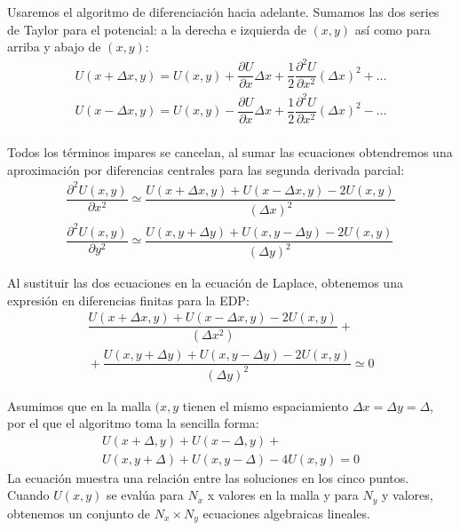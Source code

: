 \begin{frame}
\fontsize{14}{14}\selectfont
Usaremos el algoritmo de diferenciación hacia adelante. Sumamos las dos series de Taylor para el potencial: a la derecha e izquierda de $(x,y)$ así como para arriba y abajo de $(x,y)$:
\begin{eqnarray*}
U(x+\Delta x,y) = U(x,y) + \dfrac{\partial U}{\partial x} \Delta x + \dfrac{1}{2} \dfrac{\partial^{2} U}{\partial x^{2}} (\Delta x)^{2} + \ldots \\
U(x -\Delta x,y) = U(x,y) - \dfrac{\partial U}{\partial x} \Delta x + \dfrac{1}{2} \dfrac{\partial^{2} U}{\partial x^{2}} (\Delta x)^{2} - \ldots \\
\end{eqnarray*}
\end{frame}
\begin{frame}
\fontsize{14}{14}\selectfont
Todos los términos impares se cancelan, al sumar las ecuaciones obtendremos una aproximación por diferencias centrales para las segunda derivada parcial:
\begin{eqnarray*}
\dfrac{\partial^{2} U(x,y)}{\partial x^{2}} \simeq \dfrac{U(x+\Delta x, y) + U(x-\Delta x,y)-2U(x,y)}{(\Delta x)^{2}} \\
\dfrac{\partial^{2} U(x,y)}{\partial y^{2}} \simeq \dfrac{U(x, y+\Delta y) + U(x,y-\Delta y)-2U(x,y)}{(\Delta y)^{2}}
\end{eqnarray*}
\end{frame}
\begin{frame}
\fontsize{14}{14}\selectfont
Al sustituir las dos ecuaciones en la ecuación de Laplace, obtenemos una expresión en diferencias finitas para la EDP:
\begin{eqnarray*}
\dfrac{U(x+\Delta x,y) + U(x-\Delta x, y) - 2U(x,y)}{(\Delta x^{2})} + {} \\
{} + \dfrac{U(x,y+\Delta y) + U(x,y-\Delta y) - 2U(x,y)}{(\Delta y)^{2}} \simeq 0
\end{eqnarray*}
\end{frame}
\begin{frame}
\fontsize{14}{14}\selectfont
Asumimos que en la malla $(x,y$ tienen el mismo espaciamiento $\Delta x =  \Delta y = \Delta$, por el que el algoritmo toma la sencilla forma:
\begin{eqnarray*}
U(x + \Delta, y)+ U(x-\Delta, y) + {} \\
U(x,y +\Delta) + U(x,y - \Delta) - 4 U(x,y)= 0
\end{eqnarray*}
La ecuación muestra una relación entre las soluciones en los cinco puntos. Cuando $U(x,y)$ se evalúa para $N_{x}$ x valores en la malla y para $N_{y}$ y valores, obtenemos un conjunto de $N_{x} \times N_{y}$ ecuaciones algebraicas lineales.
\end{frame}
